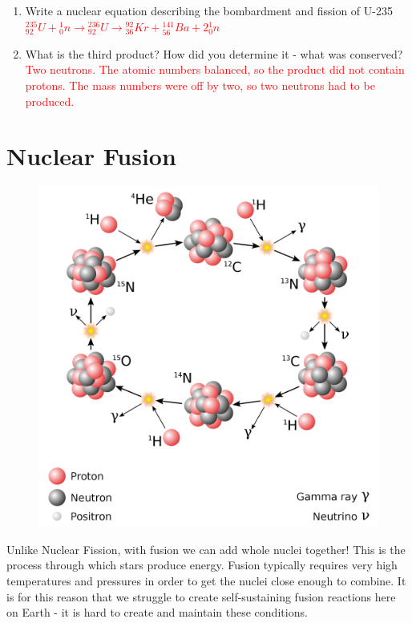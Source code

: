 \documentclass[12pt]{report}
\makeatletter
\DeclareRobustCommand{\StudentVSpace}[2]{%
	\ifthenelse{\boolean{@answer}}
	{\textcolor{red}{\\#1}}
	{\vspace{#2}}
}
\makeatother
\begin{document}
\begin{enumerate}
	\item Write a nuclear equation describing the bombardment and fission of U-235
	\StudentVSpace{
		${}^{235}_{92}U + {}^{1}_{0}n \rightarrow {}^{236}_{92}U \rightarrow {}^{92}_{36}Kr + {}^{141}_{56}Ba + 2{}^{1}_{0}n$
	}{1.5cm}
	
	\item What is the third product? How did you determine it - what was conserved?
	\StudentVSpace{
		Two neutrons. The atomic numbers balanced, so the product did not contain protons. The mass numbers were off by two, so two neutrons had to be produced.
	}{2cm}
\end{enumerate}

\section{Nuclear Fusion}

\begin{figure}
	\centering
	\includegraphics[width=0.9\linewidth]{CNO-cycle.png}
\end{figure}

Unlike Nuclear Fission, with fusion we can add whole nuclei together! This is the process through which stars produce energy. Fusion typically requires very high temperatures and pressures in order to get the nuclei close enough to combine. It is for this reason that we struggle to create self-sustaining fusion reactions here on Earth - it is hard to create and maintain these conditions.
\end{document}

